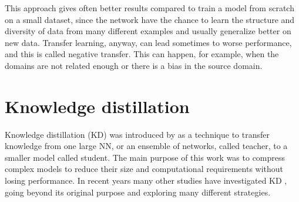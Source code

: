 This approach gives often better results compared to train a model from scratch on a small dataset, since the network have the chance to learn the structure and diversity of data from many different examples and usually generalize better on new data.
Transfer learning, anyway, can lead sometimes to worse performance, and this is called negative transfer.
This can happen, for example, when the domains are not related enough or there is a bias in the source domain.


\section{Knowledge distillation}
Knowledge distillation (KD) was introduced by \citeauthor{hinton2015distilling} \cite{hinton2015distilling} as a technique to transfer knowledge from one large NN, or an ensemble of networks, called teacher, to a smaller model called student.
The main purpose of this work was to compress complex models to reduce their size and computational requirements without losing performance.
In recent years many other studies have investigated KD \cite{gou2021knowledge}, going beyond its original purpose and exploring many different strategies.

